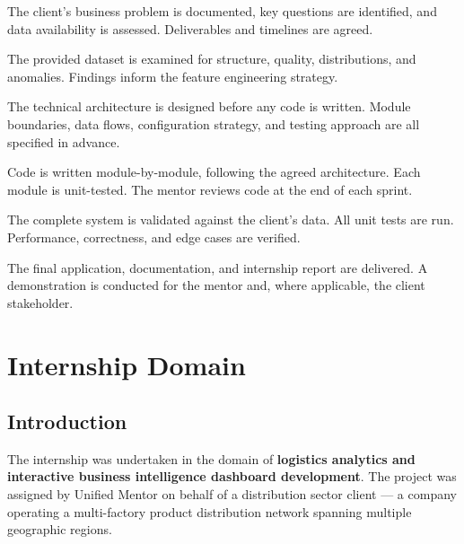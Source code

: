 \documentclass[12pt, a4paper]{report}
\begin{document}
\begin{description}[leftmargin=0pt, itemsep=6pt]
  \item[\textbf{Client Brief \& Scoping:}]
    The client's business problem is documented, key questions are identified,
    and data availability is assessed. Deliverables and timelines are agreed.

  \item[\textbf{Data Exploration (EDA):}]
    The provided dataset is examined for structure, quality, distributions,
    and anomalies. Findings inform the feature engineering strategy.

  \item[\textbf{Architecture Design:}]
    The technical architecture is designed before any code is written.
    Module boundaries, data flows, configuration strategy, and testing
    approach are all specified in advance.

  \item[\textbf{Development (Sprints):}]
    Code is written module-by-module, following the agreed architecture.
    Each module is unit-tested. The mentor reviews code at the end of
    each sprint.

  \item[\textbf{Testing \& Validation:}]
    The complete system is validated against the client's data. All unit
    tests are run. Performance, correctness, and edge cases are verified.

  \item[\textbf{Delivery \& Handover:}]
    The final application, documentation, and internship report are
    delivered. A demonstration is conducted for the mentor and, where
    applicable, the client stakeholder.
\end{description}

\chapter{Internship Domain}

\section{Introduction}

The internship was undertaken in the domain of \textbf{logistics analytics and
interactive business intelligence dashboard development}. The project was
assigned by Unified Mentor on behalf of a distribution sector client — a
company operating a multi-factory product distribution network spanning
multiple geographic regions.
\end{document}
